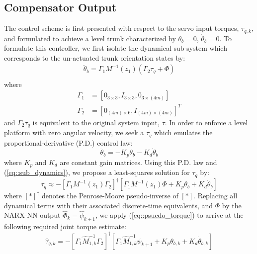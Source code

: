 \subsection{Compensator Output}


The control scheme is first presented with respect to the servo input torques, $\tau_{q,k}$, %
and formulated to achieve a level trunk characterized by $\theta_{b}=0$, $\dot{\theta}_{b}= 0$. To formulate this controller, 
we first isolate the dynamical sub-system which corresponds to the un-actuated trunk orientation states by:
	\begin{equation}
		\begin{split}
		\ddot{\theta}_{b} 	= \Gamma_{1} M^{-1}(z_{1})( \Gamma_{2}\tau_{q}	 + \Phi) \\
		\end{split}	
		\label{eq::sub_dynamics}
	\end{equation}
where 
	\begin{equation*}
		\begin{split}
		\Gamma_{1} &= [0_{3\times3},I_{3\times3},0_{3\times(4m)}] \\
		\Gamma_{2} &= [0_{(4m)\times6},I_{(4m)\times(4m)}]^{T}	
		\end{split}	
	\end{equation*}
and $\Gamma_{2}\tau_{q}$ is equivalent to the original system input, $\tau$.
In order to enforce a level platform with zero angular velocity, we seek a $\tau_{q}$ which emulates
the proportional-derivative (P.D.) control law:
	\begin{equation}
	 	\ddot{\theta}_{b} = - K_{p}{\theta}_{b} - K_{d}\dot{\theta}_{b}
	\end{equation}
where $K_{p}$ and $K_{d}$ are constant gain matrices. Using this P.D. law and (\ref{eq::sub_dynamics}), 
we propose a least-squares solution for $\tau_{q}$ by:
	\begin{equation}
		\tau_{q} \approx  -
		\left[\Gamma_{1} M^{-1}(z_{1}) \Gamma_{2}\right]^{\dagger}
		\left[\Gamma_{1} M^{-1}(z_{1}) \Phi + K_{p}{\theta}_{b} + K_{d}\dot{\theta}_{b} \right]
		\label{eq::psuedo_torque}
	\end{equation}
where $\left[*\right]^{\dagger}$ denotes the Penrose-Moore pseudo-inverse of $[*]$.
Replacing all dynamical terms with their associated discrete-time equivalents, and $\Phi$ by 
the NARX-NN output $\hat{\Phi}_{k}=\hat{\psi}_{k+1}$, we apply (\ref{eq::psuedo_torque})
 to arrive at the following required joint torque estimate:
	\begin{equation}
		\hat{\tau}_{q,k} =  -
		\left[\Gamma_{1} \hat{M}^{-1}_{1,k} \Gamma_{2}\right]^{\dagger} 
		\left[\Gamma_{1}\hat{M}^{-1}_{1,k}\hat{\psi}_{k+1} + K_{p}{\theta}_{b,k} + K_{d}\dot{\theta}_{b,k} \right]
		\label{eq::psuedo_torque_k}
	\end{equation}
